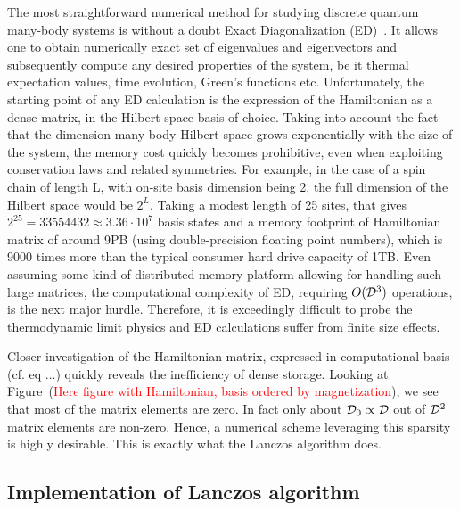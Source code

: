 The most straightforward numerical method for studying discrete quantum many-body systems is without a doubt
Exact Diagonalization (ED)~\autocite{Weisse2008}.
It allows one to obtain numerically exact set of eigenvalues and eigenvectors and subsequently compute any desired properties
of the system, be it thermal expectation values, time evolution, Green's functions etc. Unfortunately, the starting point of any
ED calculation is the expression of the Hamiltonian as a dense matrix, in the Hilbert space basis of choice. Taking into account
the fact that the dimension many-body Hilbert space grows exponentially with the size of the system, the memory cost quickly becomes
prohibitive, even when exploiting conservation laws and related symmetries. For example, in the case of a spin chain of length L, with 
on-site basis dimension being 2, the full dimension of the Hilbert space would be \(2^{L}\). Taking a modest length of 25 sites, that gives
\(2^{25} = 33554432\approx 3.36 \cdot 10^7\) basis states and a memory footprint of Hamiltonian matrix of around 9PB (using double-precision
floating point numbers), which is 9000 times more than the typical consumer hard drive capacity of 1TB. Even assuming some kind of distributed
memory platform allowing for handling such large matrices, the computational complexity of ED, requiring \(O(\mathcal{D}^3)\) operations,
is the next major hurdle. Therefore, it is exceedingly
difficult to probe the thermodynamic limit physics and ED calculations suffer from finite size effects.

Closer investigation of the Hamiltonian matrix, expressed in computational basis (cf. eq ...) quickly reveals the inefficiency of dense
storage. Looking at Figure~(\textcolor{red}{Here figure with Hamiltonian, basis ordered by magnetization}), we see that most of
the matrix elements are zero. In fact only about \(\mathcal{D}_0\propto \mathcal{D} \) out of \(\mathcal{D}^2\) matrix elements
are non-zero. Hence, a numerical scheme leveraging this sparsity is highly desirable. This is exactly what the Lanczos
algorithm does.

\subsection{Implementation of Lanczos algorithm}


